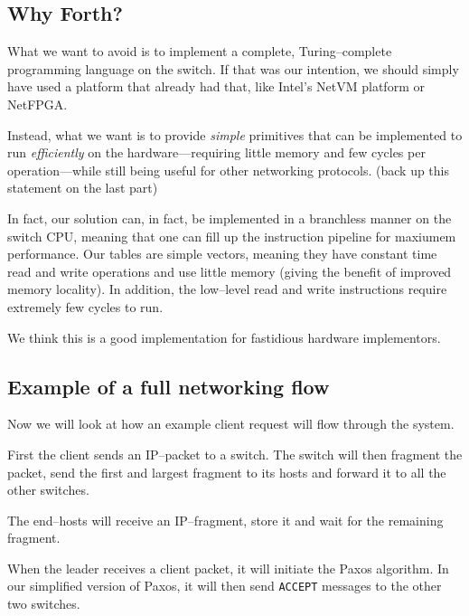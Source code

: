 \subsection{Why Forth?}


What we want to avoid is to implement a complete, Turing--complete
programming language on the switch.  If that was our intention, we should
simply have used a platform that already had that, like Intel's NetVM
platform or NetFPGA.

Instead, what we want is to provide \textit{simple} primitives that can be
implemented to run \textit{efficiently} on the hardware---requiring little
memory and few cycles per operation---while still being useful for other
networking protocols. (back up this statement on the last part)

In fact, our solution can, in fact, be implemented in a branchless manner on the
switch CPU, meaning that one can fill up the instruction pipeline for
maxiumem performance.  Our tables are simple vectors, meaning they
have constant time read and write operations and use little memory
(giving the benefit of improved memory locality).  In addition, the
low--level read and write instructions require extremely few cycles to run.

We think this is a good implementation for fastidious hardware implementors.

\subsection{Example of a full networking flow}

Now we will look at how an example client request will flow through the
system.

First the client sends an IP--packet to a switch.
The switch will then fragment the packet, send the first and largest
fragment to its hosts and forward it to all the other switches.

The end--hosts will receive an IP--fragment, store it and wait for the
remaining fragment.

When the leader receives a client packet, it will initiate the Paxos
algorithm.  In our simplified version of Paxos, it will then send
\texttt{ACCEPT} messages to the other two switches.

